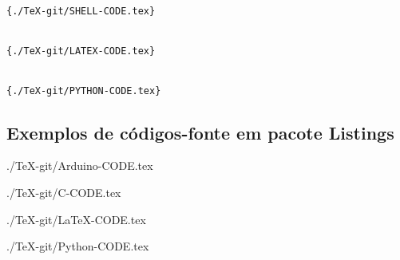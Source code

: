 \begin{multicols}{2}
\begin{verbatim}

{./TeX-git/SHELL-CODE.tex}


{./TeX-git/LATEX-CODE.tex}


{./TeX-git/PYTHON-CODE.tex}
\end{verbatim}

\subsection[Exemplos de códigos-fonte em pacote Listings]{Exemplos de códigos-fonte em pacote Listings}



{./TeX-git/Arduino-CODE.tex}


{./TeX-git/C-CODE.tex}


{./TeX-git/LaTeX-CODE.tex}


{./TeX-git/Python-CODE.tex}

\end{multicols}

\vfill\null
\pagebreak

